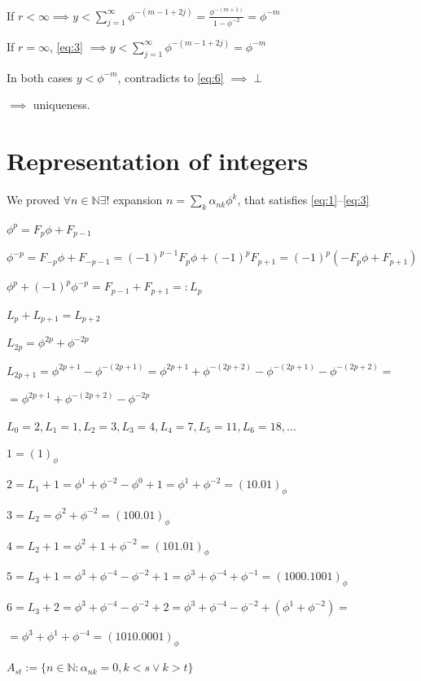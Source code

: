 \documentclass{article}
\begin{document}
If \( r < \infty \implies y < \sum_{j = 1}^\infty \phi^{-(m-1+2j)} = \frac{\phi^{-(m+1)}}{1-\phi^{-2}} = \phi^{-m} \)

If \( r = \infty \), \eqref{eq:3} \( \implies y < \sum_{j = 1}^\infty \phi^{-(m-1+2j)} = \phi^{-m} \)

In both cases \( y < \phi^{-m} \), contradicts to \eqref{eq:6} \( \implies \perp \)

\( \implies \) uniqueness.

\section*{Representation of integers}

We proved \( \forall n \in \mathbb{N} \exists! \) expansion \( n = \sum_{k} \alpha_{nk} \phi^k \), that satisfies \eqref{eq:1}--\eqref{eq:3}

\( \phi^p = F_p \phi + F_{p-1} \)

\( \phi^{-p} = F_{-p} \phi + F_{-p-1} = (-1)^{p-1}F_p \phi + (-1)^pF_{p+1} = (-1)^p(-F_p\phi + F_{p+1}) \)

\( \phi^p + (-1)^p\phi^{-p} = F_{p-1} + F_{p+1} =: L_p \)

\( L_p + L_{p+1} = L_{p+2} \)

\( L_{2p} = \phi^{2p} + \phi^{-2p} \)

\( L_{2p+1} = \phi^{2p+1} - \phi^{-(2p+1)} = \phi^{2p+1} + \phi^{-(2p+2)} - \phi^{-(2p+1)} - \phi^{-(2p+2)} = \)

\( = \phi^{2p+1} + \phi^{-(2p+2)} - \phi^{-2p} \)

\( L_0 = 2, L_1 = 1, L_2 = 3, L_3 = 4, L_4 = 7, L_5 = 11, L_6 = 18, \ldots \)

\( 1 = (1)_\phi \)

\( 2 = L_1 + 1 = \phi^1 + \phi^{-2} - \phi^0 + 1 = \phi^1 + \phi^{-2} = (10.01)_\phi \)

\( 3 = L_2 = \phi^2 + \phi^{-2} = (100.01)_\phi \)

\( 4 = L_2 + 1= \phi^2 + 1 + \phi^{-2} = (101.01)_\phi \)

\( 5 = L_3 + 1 = \phi^3 + \phi^{-4} - \phi^{-2} + 1 = \phi^3 + \phi^{-4} + \phi^{-1} = (1000.1001)_\phi \)

\( 6 = L_3 + 2 = \phi^3 + \phi^{-4} - \phi^{-2} + 2 = \phi^3 + \phi^{-4} - \phi^{-2} + (\phi^1 + \phi^{-2}) = \)

\( = \phi^3 + \phi^1 + \phi^{-4} = (1010.0001)_\phi \)

\( A_{st} := \{ n \in \mathbb{N}: \alpha_{nk} = 0, k < s \lor k > t \} \)
\end{document}
